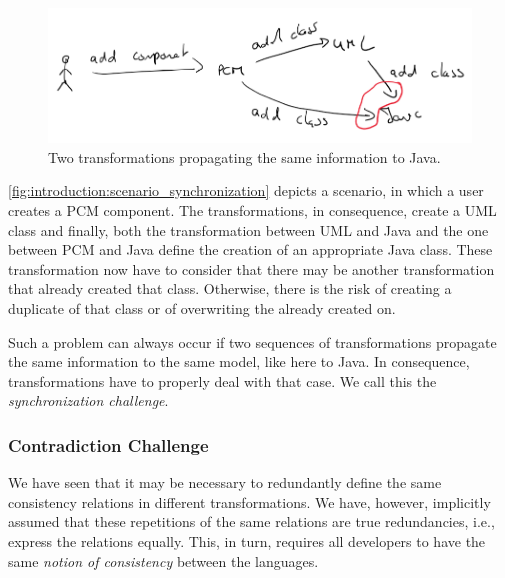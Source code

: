\begin{figure}
    \centering
    \includegraphics[width=\textwidth]{figures/prologue/introduction/scenario_synchronization.png}
    \caption[Example for transformation synchronization]{Two transformations propagating the same information to Java.}
    \label{fig:introduction:scenario_synchronization}
\end{figure}

\autoref{fig:introduction:scenario_synchronization} depicts a scenario, in which a user creates a \gls{PCM} component.
The transformations, in consequence, create a \gls{UML} class and finally, both the transformation between \gls{UML} and Java and the one between \gls{PCM} and Java define the creation of an appropriate Java class.
These transformation now have to consider that there may be another transformation that already created that class.
Otherwise, there is the risk of creating a duplicate of that class or of overwriting the already created on.

Such a problem can always occur if two sequences of transformations propagate the same information to the same model, like here to Java.
In consequence, transformations have to properly deal with that case.
We call this the \emph{synchronization challenge}.

\subsubsection*{Contradiction Challenge}

We have seen that it may be necessary to redundantly define the same consistency relations in different transformations.
We have, however, implicitly assumed that these repetitions of the same relations are true redundancies, i.e., express the relations equally.
This, in turn, requires all developers to have the same \emph{notion of consistency} between the languages.

